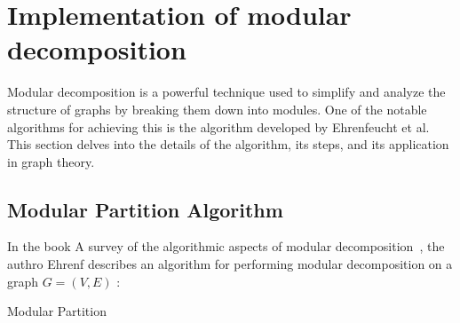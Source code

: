 
\chapter{Implementation of modular decomposition}\label{ch:implementation-of-modular-decomposition}

Modular decomposition is a powerful technique used to simplify and analyze the structure of graphs by breaking them down into modules.
One of the notable algorithms for achieving this is the algorithm developed by Ehrenfeucht et al.
This section delves into the details of the algorithm, its steps, and its application in graph theory.

\section{Modular Partition Algorithm}\label{sec:modular-partition-algorithm}

In the book A survey of the algorithmic aspects of modular decomposition~\cite{SAMD}, the authro Ehrenf describes an algorithm for performing modular decomposition on a graph $G = (V, E)$ :

\begin{algorithm}[H]
    \label{alg:modular-partition-algorithm}
    \caption{Modular Partition}
\end{algorithm}

